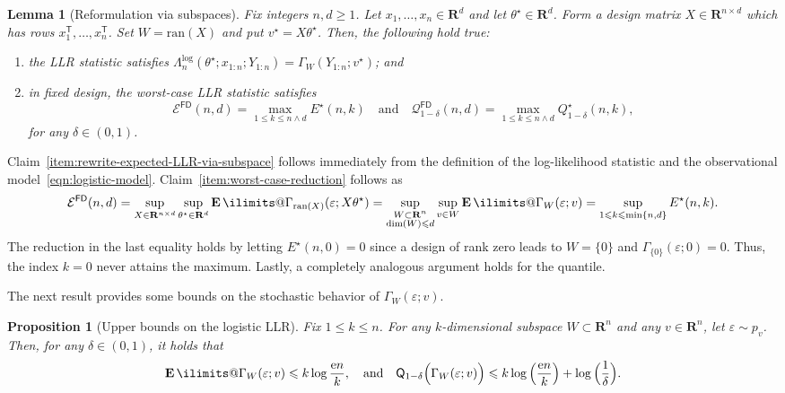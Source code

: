 \documentclass[11pt, letterpaper, hidelinks]{article}
\makeatletter
\renewcommand{\proofname}{\textit{\textbf{Proof}}}
\renewenvironment{proof}[1][\proofname]{\par\pushQED{\qed}\normalfont \topsep6\p@\@plus6\p@\relax\trivlist\item[\hskip\labelsep#1\@addpunct{}]\ignorespaces}{\popQED\endtrivlist\@endpefalse}
\newcommand{\R}{\mathbf R}
\newcommand{\cE}{\mathcal{E}}
\newcommand{\cQ}{\mathcal{Q}}
\newcommand{\twomin}[2]{\ensuremath{#1 \land #2}}
\newcommand{\e}{\mathrm{e}}
\newcommand{\1}{\mathbf 1}
\newcommand{\eps}{\varepsilon}
\renewcommand{\leq}{\leqslant}
\renewcommand{\geq}{\geqslant}
\newcommand{\T}{\mathsf{T}}
\newcommand{\E}{\operatorname*{\mathbf{E}}\ilimits@}
\theoremstyle{plain}
\newtheorem{lemma}{Lemma}[section]
\newtheorem{proposition}{Proposition}[section]
\theoremstyle{definition}
\newcommand{\thetastar}{\theta^\star}
\newcommand{\Quant}[1]{\mathsf{Q}_{#1}}
\newcommand{\FD}{\mathsf{FD}}
\newcommand{\WorstCaseFixedDesign}[2]{\cE^\FD(#1,#2)}
\newcommand{\WorstCaseFixedDesignQuant}[3]{\cQ_{#1}^\FD(#2,#3)}
\newcommand{\ran}{\mathrm{ran}}
\makeatother
\begin{document}
\begin{lemma}[Reformulation via subspaces]
\label{lem:reformulation-via-subspaces}
Fix integers $n, d \geq 1$.
Let $x_1, \dots, x_n \in \R^d$ and let $\thetastar \in \R^d$. Form a design matrix $X \in \R^{n \times d}$ which has rows $x_1^\T, \dots, x_n^\T$. Set $W = \ran(X)$ and put $v^\star = X\thetastar$. 
Then, the following hold true: 
\begin{enumerate}[label=(\roman*)]
\item 
\label{item:rewrite-expected-LLR-via-subspace}
the LLR statistic satisfies $\Lambda_n^{\operatorname{log}}(\thetastar;x_{1:n}; Y_{1:n}) = \Gamma_W(Y_{1:n}; v^\star)$; and
\item 
\label{item:worst-case-reduction}
in fixed design, the worst-case LLR statistic satisfies
\[
\WorstCaseFixedDesign{n}{d} = \max_{1 \leq k \leq \twomin{n}{d}} E^\star(n,k) 
\quad \mbox{and} 
\quad 
\WorstCaseFixedDesignQuant{1-\delta}{n}{d}
=
\max_{1 \leq k \leq \twomin{n}{d}} Q^\star_{1-\delta}(n,k),
\]
for any $\delta \in (0, 1)$.
\end{enumerate}
\end{lemma}
\begin{proof}
Claim~\ref{item:rewrite-expected-LLR-via-subspace} follows immediately from the definition of the log-likelihood statistic and the observational model~\eqref{eqn:logistic-model}. Claim~\ref{item:worst-case-reduction}
follows as 
\[
\WorstCaseFixedDesign{n}{d} = 
\sup_{X \in \R^{n \times d}}
\sup_{\thetastar \in \R^d}
\E \Gamma_{\ran(X)}(\eps; X\thetastar) = 
\sup_{\substack{W \subset \R^n \\ \dim(W) \leq d}}
\sup_{v \in W}
\E \Gamma_{W}(\eps; v) = 
\sup_{1 \leq k \leq \min\{n,d\}} 
E^\star(n,k).
\]
The reduction in the last equality holds by letting $E^\star(n,0) = 0$ since a design of rank zero leads to $W=\{0\}$ and $\Gamma_{\{0\}}(\eps;0) = 0$. Thus, the index $k=0$ never attains the maximum.
Lastly, a completely analogous argument holds for the quantile. 
\end{proof}



The next result provides some bounds on the stochastic behavior of $\Gamma_{W}(\eps; v)$. 
\begin{proposition}[Upper bounds on the logistic LLR]
\label{prop:upper-bound-on-LLR-fixed-design}
Fix $1\leq k \leq n$. 
For any $k$-dimensional subspace $W \subset \R^n$ and any $v \in \R^n$, let $\eps\sim p_v$. Then, for any $\delta \in (0, 1)$, it holds that 
\[
\E \Gamma_W(\eps; v) \leq k \log \frac{\e n}{k}, \quad \mbox{and} \quad 
\Quant{1-\delta}\Big(\Gamma_W(\eps; v)\Big) \leq k \log \Big( \frac{\e n}{k} \Big) + \log\Big(\frac{1}{\delta}\Big).
\]
\end{proposition}
\end{document}
